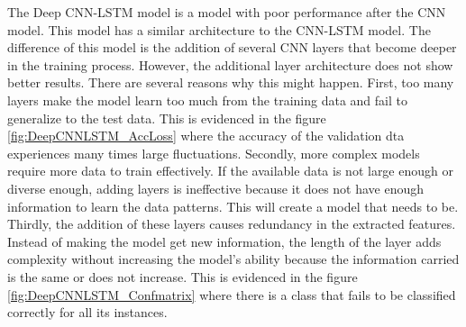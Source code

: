The Deep CNN-LSTM model is a model with poor performance after the CNN model. This model has a similar architecture to the CNN-LSTM model. The difference of this model is the addition of several CNN layers that become deeper in the training process. However, the additional layer architecture does not show better results. There are several reasons why this might happen. First, too many layers make the model learn too much from the training data and fail to generalize to the test data. This is evidenced in the figure \ref{fig:DeepCNNLSTM_AccLoss} where the accuracy of the validation dta experiences many times large fluctuations. Secondly, more complex models require more data to train effectively. If the available data is not large enough or diverse enough, adding layers is ineffective because it does not have enough information to learn the data patterns. This will create a model that needs to be. Thirdly, the addition of these layers causes redundancy in the extracted features. Instead of making the model get new information, the length of the layer adds complexity without increasing the model's ability because the information carried is the same or does not increase. This is evidenced in the figure \ref{fig:DeepCNNLSTM_Confmatrix} where there is a class that fails to be classified correctly for all its instances.

